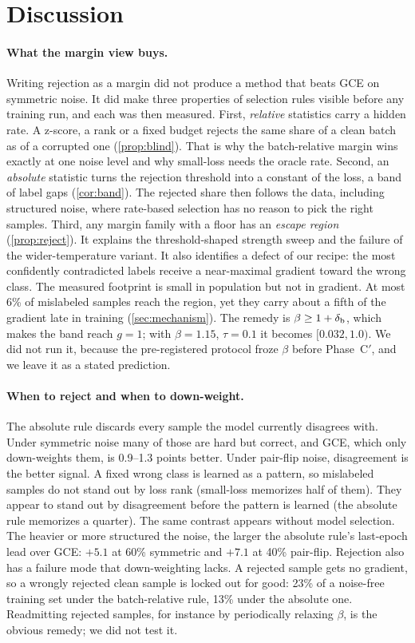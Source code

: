 \section{Discussion}
\label{sec:discussion}

\paragraph{What the margin view buys.}
Writing rejection as a margin did not produce a method that beats GCE on symmetric noise. It did
make three properties of selection rules visible before any training run, and each was then
measured. First, \emph{relative} statistics carry a hidden rate. A z-score, a rank or a fixed
budget rejects the same share of a clean batch as of a corrupted one (\cref{prop:blind}). That
is why the batch-relative margin wins exactly at one noise level and why small-loss needs the
oracle rate. Second, an \emph{absolute} statistic turns the rejection threshold into a constant of
the loss, a band of label gaps (\cref{cor:band}). The rejected share then follows the data,
including structured noise, where rate-based selection has no reason to pick the right samples.
Third, any margin family with a floor has an \emph{escape region} (\cref{prop:reject}). It
explains the threshold-shaped strength sweep and the failure of the wider-temperature variant.
It also identifies a defect of our recipe: the most confidently contradicted labels receive a
near-maximal gradient toward the wrong class. The measured footprint is small in population but not
in gradient. At most 6\% of mislabeled samples reach the region, yet they carry about a fifth of
the gradient late in training (\cref{sec:mechanism}). The remedy is $\beta \ge 1 + \delta_{\mathrm{b}}$, which makes
the band reach $g = 1$; with $\beta = 1.15$, $\tau = 0.1$ it becomes $[0.032, 1.0)$. We did not
run it, because the pre-registered protocol froze $\beta$ before Phase~C$'$, and we leave it as a
stated prediction.

\paragraph{When to reject and when to down-weight.}
The absolute rule discards every sample the model currently disagrees with. Under symmetric noise
many of those are hard but correct, and GCE, which only down-weights them, is 0.9--1.3 points
better. Under pair-flip noise, disagreement is the better signal. A fixed wrong class is learned
as a pattern, so mislabeled samples do not stand out by loss rank (small-loss memorizes half of
them). They appear to stand out by disagreement before the pattern is learned (the absolute rule
memorizes a quarter).
The same contrast appears without model selection. The heavier or more structured the noise, the
larger the absolute rule's last-epoch lead over GCE: $+5.1$ at 60\% symmetric and $+7.1$ at 40\%
pair-flip. Rejection also has a failure mode that down-weighting lacks. A rejected sample gets no
gradient, so a wrongly rejected clean sample is locked out for good: 23\% of a noise-free training
set under the batch-relative rule, 13\% under the absolute one. Readmitting rejected samples, for
instance by periodically relaxing $\beta$, is the obvious remedy; we did not test it.

